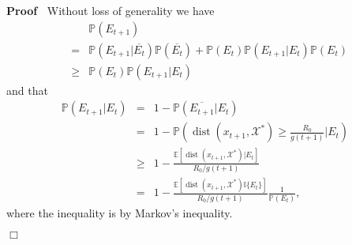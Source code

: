 \documentclass{article}
\newcommand{\tmop}[1]{\ensuremath{\operatorname{#1}}}
\newenvironment{proof}{\noindent\textbf{Proof\ }}{\hspace*{\fill}$\Box$\medskip}
\begin{document}
\begin{proof}
  Without loss of generality we have
  \begin{eqnarray*}
    &  & \mathbb{P} (E_{t + 1})\\
    & = & \mathbb{P} (E_{t + 1} | \overline{E_t}) \mathbb{P} (\overline{E_t})
    +\mathbb{P} (E_t) \mathbb{P} (E_{t + 1} |E_t) \mathbb{P} (E_t)\\
    & \geq & \mathbb{P} (E_t) \mathbb{P} (E_{t + 1} |E_t)
  \end{eqnarray*}
  and that
  \begin{eqnarray*}
    \mathbb{P} (E_{t + 1} |E_t) & = & 1 -\mathbb{P} (\overline{E_{t + 1}}
    |E_t)\\
    & = & 1 -\mathbb{P} \left( \tmop{dist} (x_{t + 1}, \mathcal{X}^{\ast})
    \geq \frac{R_0}{g (t + 1)} |E_t \right)\\
    & \geq & 1 - \frac{\mathbb{E} [\tmop{dist} (x_{t + 1},
    \mathcal{X}^{\ast}) | E_t]}{R_0 / g (t + 1)}\\
    & = & 1 - \frac{\mathbb{E} [\tmop{dist} (x_{t + 1}, \mathcal{X}^{\ast})
    \mathbb{I} \{ E_t \}]}{R_0 / g (t + 1)} \frac{1}{\mathbb{P} (E_t)},
  \end{eqnarray*}
  where the inequality is by Markov's inequality.
  

\end{proof}
\end{document}
